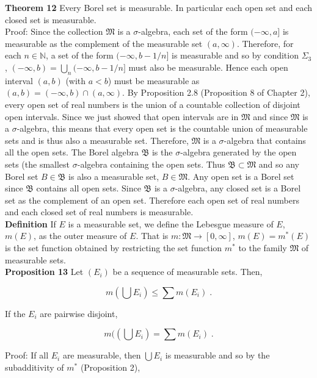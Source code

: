 \documentclass[a4paper]{article}
\begin{document}
{\bf Theorem 12} Every Borel set is measurable. In particular each open set and each closed set is measurable. \\

Proof: Since the collection $\mathfrak{M}$ is a $\sigma$-algebra, each set of the form $(-\infty, a]$ is measurable as the complement of the measurable set $(a,\infty)$. Therefore, for each $n \in \mathbb{N}$, a set of the form $(-\infty, b-1/n]$ is measurable and so by condition $\Sigma_3$, $(-\infty, b) = \bigcup_{n} (-\infty, b-1/n]$ must also be measurable. Hence each open interval $(a,b)$ (with $a < b$) must be measurable as $(a,b) = (-\infty, b) \cap (a,\infty)$. By Proposition 2.8 (Proposition 8 of Chapter 2), every open set of real numbers is the union of a countable collection of disjoint open intervals. Since we just showed that open intervals are in $\mathfrak{M}$ and since $\mathfrak{M}$ is a $\sigma$-algebra, this means that every open set is the countable union of measurable sets and is thus also a measurable set. Therefore, $\mathfrak{M}$ is a $\sigma$-algebra that contains all the open sets. The Borel algebra $\mathfrak{B}$ is the $\sigma$-algebra generated by the open sets (the smallest $\sigma$-algebra containing the open sets. Thus $\mathfrak{B} \subset \mathfrak{M}$ and so any Borel set $B\in \mathfrak{B}$ is also a measurable set, $B \in \mathfrak{M}$. Any open set is a Borel set since $\mathfrak{B}$ contains all open sets. Since $\mathfrak{B}$ is a $\sigma$-algebra, any closed set is a Borel set as the complement of an open set. Therefore each open set of real numbers and each closed set of real numbers is measurable. \\

{\bf Definition} If $E$ is a measurable set, we define the Lebesgue measure of $E$, $m(E)$, as the outer measure of $E$. That is $m : \mathfrak{M} \rightarrow [0,\infty]$, $m(E) = m^*(E)$ is the set function obtained by restricting the set function $m^*$ to the family $\mathfrak{M}$ of measurable sets. \\

{\bf Proposition 13} Let $(E_i)$ be a sequence of measurable sets. Then,

$$m\left(\bigcup E_i\right) \leq \sum m(E_i) \;.$$

If the $E_i$ are pairwise disjoint,

$$m(\left(\bigcup E_i \right) = \sum m(E_i) \;.$$

Proof: If all $E_i$ are measurable, then $\bigcup E_i$ is measurable and so by the subadditivity of $m^*$ (Proposition 2),
\end{document}
